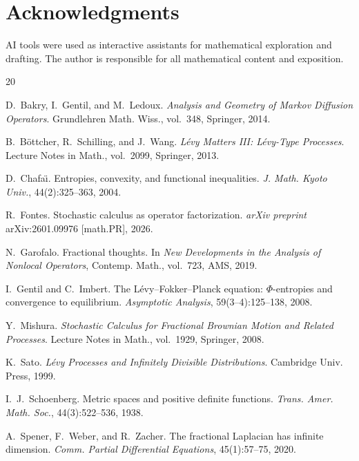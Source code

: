 \documentclass[11pt,a4paper]{article}
\theoremstyle{plain}
\theoremstyle{definition}
\theoremstyle{remark}
\begin{document}
\section*{Acknowledgments}
AI tools were used as interactive assistants for mathematical
exploration and drafting. The author
is responsible for all mathematical content and exposition.


\begin{thebibliography}{20}

D.~Bakry, I.~Gentil, and M.~Ledoux.
\newblock \emph{Analysis and Geometry of Markov Diffusion Operators}.
\newblock Grundlehren Math. Wiss., vol.~348, Springer, 2014.

B.~B\"ottcher, R.~Schilling, and J.~Wang.
\newblock \emph{L\'evy Matters III: L\'evy-Type Processes}.
\newblock Lecture Notes in Math., vol.~2099, Springer, 2013.

D.~Chafa\"{\i}.
\newblock Entropies, convexity, and functional inequalities.
\newblock \emph{J. Math. Kyoto Univ.}, 44(2):325--363, 2004.

R.~Fontes.
\newblock Stochastic calculus as operator factorization.
\newblock \emph{arXiv preprint} arXiv:2601.09976 [math.PR], 2026.

N.~Garofalo.
\newblock Fractional thoughts.
\newblock In \emph{New Developments in the Analysis of Nonlocal Operators},
  Contemp. Math., vol.~723, AMS, 2019.

I.~Gentil and C.~Imbert.
\newblock The {L}\'evy--{F}okker--{P}lanck equation: $\Phi$-entropies
  and convergence to equilibrium.
\newblock \emph{Asymptotic Analysis}, 59(3--4):125--138, 2008.

Y.~Mishura.
\newblock \emph{Stochastic Calculus for Fractional Brownian Motion
  and Related Processes}.
\newblock Lecture Notes in Math., vol.~1929, Springer, 2008.

K.~Sato.
\newblock \emph{L\'evy Processes and Infinitely Divisible Distributions}.
\newblock Cambridge Univ. Press, 1999.

I.~J.~Schoenberg.
\newblock Metric spaces and positive definite functions.
\newblock \emph{Trans. Amer. Math. Soc.}, 44(3):522--536, 1938.

A.~Spener, F.~Weber, and R.~Zacher.
\newblock The fractional {L}aplacian has infinite dimension.
\newblock \emph{Comm. Partial Differential Equations}, 45(1):57--75, 2020.

\end{thebibliography}
\end{document}
